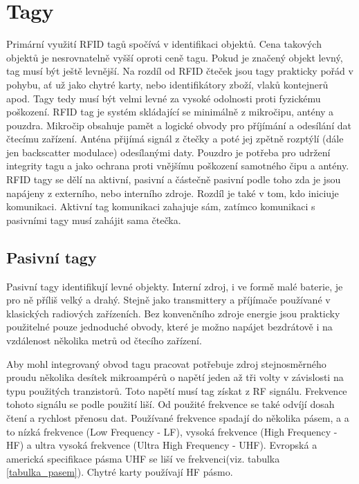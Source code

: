 \section{Tagy}
Primární využití RFID tagů spočívá v identifikaci objektů. Cena takových objektů je nesrovnatelně vyšší oproti ceně tagu. Pokud je značený objekt levný, tag musí být ještě levnější. Na rozdíl od RFID čteček jsou tagy prakticky pořád v pohybu, ať už jako chytré karty, nebo identifikátory zboží, vlaků kontejnerů apod. Tagy tedy musí být velmi levné za vysoké odolnosti proti fyzickému poškození\cite{The_RF_in_RFID}.
RFID tag je systém skládající se minimálně z mikročipu, antény a pouzdra. Mikročip obsahuje pamět a logické obvody pro příjímání a odesílání dat čtecímu zařízení. Anténa přijímá signál z čtečky a poté jej zpětně rozptýlí (dále jen backscatter modulace) odesílanými daty. Pouzdro je potřeba pro udržení integrity tagu a jako ochrana proti vnějšímu poškození samotného čipu a antény\cite{RFID_explained}.
RFID tagy se dělí na aktivní, pasivní a částečně pasivní podle toho zda je jsou napájeny z externího, nebo interního zdroje\cite{The_RF_in_RFID}. Rozdíl je také v tom, kdo iniciuje komunikaci. Aktivní tag komunikaci zahajuje sám, zatímco komunikaci s pasivními tagy musí zahájit sama čtečka\cite{Hazardous_areas}. 

\subsection{Pasivní tagy}
Pasivní tagy identifikují levné objekty. Interní zdroj, i ve formě malé baterie, je pro ně příliš velký a drahý. Stejně jako transmittery a příjímače používané v klasických radiových zařízeních. Bez konvenčního zdroje energie jsou prakticky použitelné pouze jednoduché obvody, které je možno napájet bezdrátově i na vzdálenost několika metrů od čtecího zařízení. 
\par 
Aby mohl integrovaný obvod tagu pracovat potřebuje zdroj stejnosměrného proudu několika desítek mikroampérů o napětí  jeden až tři volty v závislosti na typu použitých tranzistorů. Toto napětí musí tag získat z RF signálu\cite{The_RF_in_RFID}. Frekvence tohoto signálu se podle použití liší. Od použité frekvence se také odvíjí dosah čtení a rychlost přenosu dat. Používané frekvence spadají do několika pásem, a a to nízká frekvence ({Low Frequency - LF}), vysoká frekvence ({High Frequency - HF}) a ultra vysoká frekvence ({Ultra High Frequency - UHF}). Evropská a americká specifikace pásma UHF se liší ve frekvenci(viz. tabulka \ref{tabulka_pasem}). Chytré karty používají HF pásmo\cite{Smart_Cards_Tokens_Security}. 

